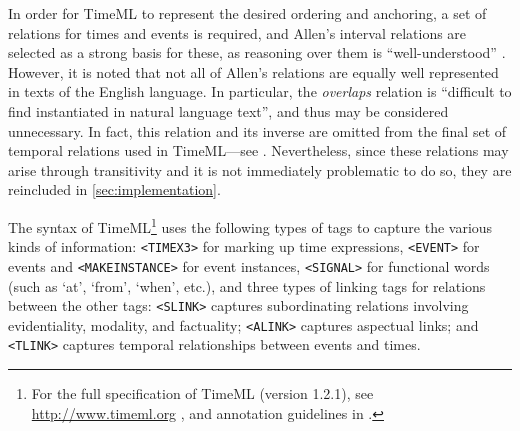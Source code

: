 \documentclass[a4paper,12pt,leqno,twoside]{article}
\newcommand{\citeneeded}[1][]{{\color{red}[Citation needed!#1]}}
\begin{document}
In order for TimeML to represent the desired ordering and anchoring, a set of relations for times and events is required, and Allen's interval relations are selected as a strong basis for these, as reasoning over them is ``well-understood'' \citep[p. 138]{Pustejovsky2005}. However, it is noted that not all of Allen's relations are equally well represented in texts of the English language. In particular, the \textit{overlaps} relation is ``difficult to find instantiated in natural language text'', and thus may be considered unnecessary. In fact, this relation and its inverse are omitted from the final set of temporal relations used in TimeML---see . Nevertheless, since these relations may arise through transitivity and it is not immediately problematic to do so, they are reincluded in \cref{sec:implementation}.

The syntax of TimeML\footnote{For the full specification of TimeML (version 1.2.1), see \url{http://www.timeml.org} \citep{timeml2005timeml}, and annotation guidelines in \citet{sauri2006timeml}.} %
uses the following types of tags to capture the various kinds of information: \verb|<TIMEX3>| for marking up time expressions, \verb|<EVENT>| for events and \verb|<MAKEINSTANCE>| for event instances, \verb|<SIGNAL>| for functional words (such as `at', `from', `when', etc.), and three types of linking tags for relations between the other tags: \verb|<SLINK>| captures subordinating relations involving evidentiality, modality, and factuality; \verb|<ALINK>| captures aspectual links; and \verb|<TLINK>| captures temporal relationships between events and times.
\end{document}
